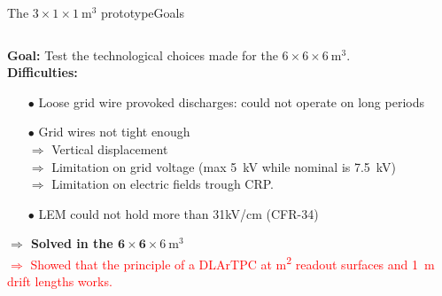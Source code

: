\documentclass[10pt]{beamer}
\begin{document}
\begin{frame}{The \texorpdfstring{$3 \times 1 \times \SI{1}{\meter\cubed}$}{311} prototype}{Goals}
\begin{scriptsize}
\begin{columns}
\begin{column}{0.48\textwidth}
    				\textbf{Goal:} Test the technological choices made for the $6 \times 6 \times \SI{6}{\meter\cubed}$.\\
    				\vspace{0.3cm}
    				\textbf{Difficulties:} 
    				\begin{itemize}
    					\item[$\bullet$] Loose grid wire provoked discharges: could not operate on long periods
    					\item[$\bullet$] Grid wires not tight enough\\$\Rightarrow$ Vertical displacement\\$\Rightarrow$ Limitation on grid voltage (max \SI{5}{\kilo\volt} while nominal is \SI{7.5}{\kilo\volt})\\$\Rightarrow$ Limitation on electric fields trough CRP.
    					\item[$\bullet$] LEM could not hold more than 31kV/cm (CFR-34)
    				\end{itemize}
    				\textbf{$\Rightarrow$ Solved in the $\mathbf{6 \times 6 \times} \SI[detect-weight
    					]{6}{\meter\cubed}$}\\
    				\vspace{0.3cm}
    				\textcolor{red}{$\Rightarrow$ Showed that the principle of a DLArTPC at \si{\meter\squared} readout surfaces and \SI{1}{\meter} drift lengths works.}
    			\end{column}
    		\end{columns}
	    \end{scriptsize}
    \end{frame}
    
\end{document}
